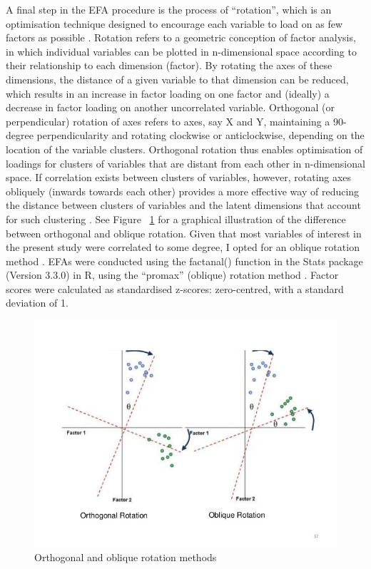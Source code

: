 \begin{CJK}{UTF8}{gbsn}
A final step in the EFA procedure is the process of ``rotation'', which is an optimisation technique designed to encourage each variable to load on as few factors as possible \citep{Rummel1988}. Rotation refers to a geometric conception of factor analysis, in which individual variables can be plotted in n-dimensional space according to their relationship to each dimension (factor). By rotating the axes of these dimensions, the distance of a given variable to that dimension can be reduced, which results in an increase in factor loading on one factor and (ideally) a decrease in factor loading on another uncorrelated variable. Orthogonal (or perpendicular) rotation of axes refers to axes, say X and Y, maintaining a 90-degree perpendicularity and rotating clockwise or anticlockwise, depending on the location of the variable clusters.
Orthogonal rotation thus enables optimisation of loadings for clusters of variables that are distant from each other in n-dimensional space. If correlation exists between clusters of variables, however, rotating axes obliquely (inwards towards each other) provides a more effective way of reducing the distance between clusters of variables and the latent dimensions that account for such clustering \citep{Osborne2015}. See Figure ~\ref{fig:orthogonalOblique} for a graphical  illustration of the difference between orthogonal and oblique rotation. Given that most variables of interest in the present study were correlated to some degree, I opted for an oblique rotation method \citep{Field2012}. EFAs were conducted using the factanal() function in the Stats package (Version 3.3.0) in R, using the ``promax'' (oblique) rotation method \citep{Gorsuch1983}. Factor scores were calculated as standardised z-scores: zero-centred, with a standard deviation of 1.

\begin{figure}[htbp]
  \begin{center}
    \includegraphics[width= \linewidth, scale = .5]{images/orthogonalObliqueRotationExample.jpg}
    \caption{Orthogonal and oblique rotation methods}
    \label{fig:orthogonalOblique}
  \end{center}
\end{figure}



\end{CJK}
